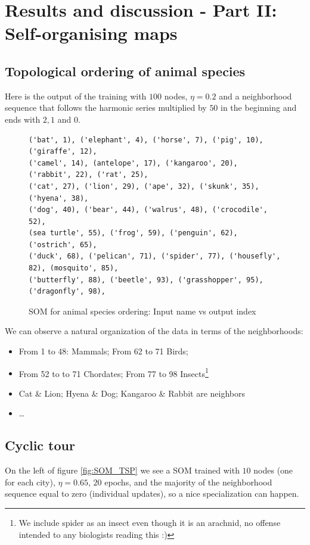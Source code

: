 \documentclass[a4paper]{article}
\begin{document}
\section{Results and discussion - Part II: Self-organising maps}

\subsection{Topological ordering of animal species}
Here is the output of the training with $100$ nodes, $\eta = 0.2$ and a neighborhood sequence that follows the harmonic series multiplied by $50$ in the beginning and ends with $2, 1$ and $0$.
\begin{figure}[H]
     \centering
\begin{verbatim}
('bat', 1), ('elephant', 4), ('horse', 7), ('pig', 10), ('giraffe', 12), 
('camel', 14), (antelope', 17), ('kangaroo', 20), ('rabbit', 22), ('rat', 25),
('cat', 27), ('lion', 29), ('ape', 32), ('skunk', 35), ('hyena', 38),
('dog', 40), ('bear', 44), ('walrus', 48), ('crocodile', 52),
(sea turtle', 55), ('frog', 59), ('penguin', 62), ('ostrich', 65),
('duck', 68), ('pelican', 71), ('spider', 77), ('housefly', 82), (mosquito', 85),
('butterfly', 88), ('beetle', 93), ('grasshopper', 95), ('dragonfly', 98), 
\end{verbatim}
\centering
\caption{SOM for animal species ordering: Input name vs output index}
    \label{fig:my_label}
\end{figure}

We can observe a natural organization of the data in terms of the neighborhoods: 
\begin{itemize}
    \item From 1 to 48: Mammals;  From 62 to 71 Birds;
    \item From  52 to to 71 Chordates; From 77 to 98 Insects\footnote{We include spider as an insect even though it is an arachnid, no offense intended to any biologists reading this :)}
    \item Cat \& Lion; Hyena \& Dog; Kangaroo \& Rabbit are neighbors
    \item \ldots
\end{itemize}

\subsection{Cyclic tour}
On the left of figure \ref{fig:SOM_TSP} we see a SOM trained with $10$ nodes (one for each city), $\eta = 0.65$, $20$ epochs, and the majority of the neighborhood sequence equal to zero (individual updates), so a nice specialization can happen.
\end{document}
